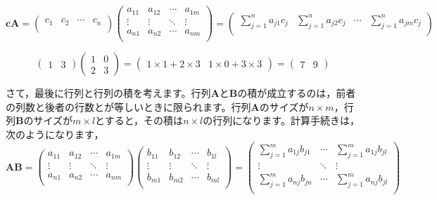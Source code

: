 \documentclass{ltjsbook}
\begin{document}
\begin{equation*}
\bm{c} \bm{A} = 
\begin{pmatrix}
c_1 & c_2 & \cdots & c_n\\
\end{pmatrix}
\begin{pmatrix}
a_{11} & a_{12} & \cdots & a_{1m}\\
\vdots & \vdots & \ddots & \vdots \\
a_{n1} & a_{n2} & \cdots & a_{nm}\\
\end{pmatrix}
=
\begin{pmatrix}
\displaystyle{\sum_{j=1}^{n}a_{j1}c_{j}} & \displaystyle{\sum_{j=1}^{n} a_{j2}c_{j}} & \cdots & \displaystyle{\sum_{j=1}^{n} a_{jm}c_{j}}\\
\end{pmatrix}
\end{equation*}

\begin{equation*}
\begin{pmatrix}
1&3
\end{pmatrix}
\begin{pmatrix}
1 & 0\\
2 & 3
\end{pmatrix}
=
\begin{pmatrix}
1 \times 1 + 2 \times 3 & 1\times 0+3 \times 3
\end{pmatrix}
=
\begin{pmatrix}
7 & 9
\end{pmatrix}
\end{equation*}


さて，最後に行列と行列の積を考えます。行列$\bm{A}$と$\bm{B}$の積が成立するのは，前者の列数と後者の行数とが等しいときに限られます。行列$\bm{A}$のサイズが$n \times m$，行列$\bm{B}$のサイズが$m \times l$とすると，その積は$n \times l$の行列になります。計算手続きは，次のようになります，
\begin{equation*}
\bm{A} \bm{B} =
\begin{pmatrix}
a_{11} & a_{12} & \cdots & a_{1m}\\
\vdots & \vdots & \ddots & \vdots \\
a_{n1} & a_{n2} & \cdots & a_{nm}\\
\end{pmatrix}
\begin{pmatrix}
b_{11} & b_{12} & \cdots & b_{1l}\\
\vdots & \vdots & \ddots & \vdots \\
b_{m1} & b_{m2} & \cdots & b_{ml}\\
\end{pmatrix}
=
\begin{pmatrix}
\sum_{j=1}^{m} a_{1j} b_{j1} & \cdots & \sum_{j=1}^{m} a_{1j} b_{jl}\\
\vdots & \ddots & \vdots \\
\sum_{j=1}^{m} a_{nj} b_{jn} & \cdots & \sum_{j=1}^{m} a_{nj} b_{jl}\\
\end{pmatrix}
\end{equation*}
\end{document}
